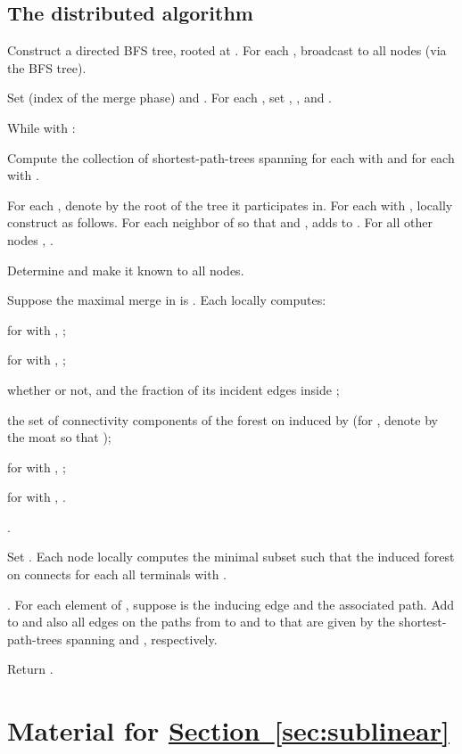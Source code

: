 \documentclass[letterpaper,11pt]{article}
\newcommand{\namedref}[2]{\hyperref[#2]{#1~\ref*{#2}}}
\newcommand{\sectionref}[1]{\namedref{Section}{#1}}
\begin{document}
\subsection{The distributed algorithm}
\label{app-distalg}
\begin{compactenum}
\item Construct a directed BFS tree, rooted at . For each , broadcast
 to all nodes (via the BFS tree).
\item Set  (index of the merge phase) and . For
each , set , , and
.
\item While  with :
\begin{compactenum}
\item Compute the collection of shortest-path-trees spanning for each 
with   and for each  with 
.
\item For each , denote by  the root of the tree  it
participates in. For each  with , locally construct
 as follows. For each neighbor  of  so that  and
, 
adds  to . For all other nodes ,
.
\item Determine  and make it known to all nodes.
\item Suppose the maximal merge in  is
. Each  locally computes:
\begin{compactitem}
\item for  with ,
; 
\item for  with ,
;
\item whether  or not, and the fraction of its
incident edges inside ;
\item the set  of connectivity components of the forest on 
induced by  (for , denote by  the moat so that );
\item for  with , ;
\item for  with , .
\end{compactitem}
\item .
\end{compactenum}
\item Set .
Each node locally computes the minimal subset  such that
the induced forest on  connects for each  all terminals
 with .
\item . For each element of , suppose  is the
inducing edge and  the associated path. Add  to  and also all
edges on the paths from  to  and  to  that are given by the
shortest-path-trees spanning  and ,
respectively.
\item Return .
\end{compactenum}

\section{Material for \texorpdfstring{\sectionref{sec:sublinear}}{Section
\ref*{sec:sublinear}}}
\label{app:sublinear}
\end{document}

